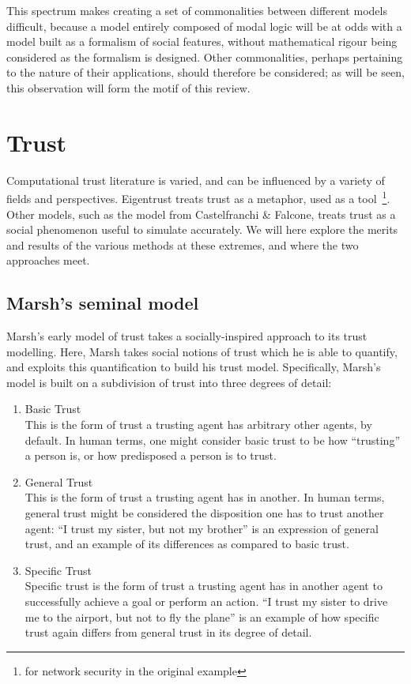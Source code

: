 \documentclass[11pt,english,twocolumn]{article}
\begin{document}
This spectrum makes creating a set of commonalities between different models difficult, because a model entirely composed of modal logic will be at odds with a model built as a formalism of social features, without mathematical rigour being considered as the formalism is designed. Other commonalities, perhaps pertaining to the nature of their applications, should therefore be considered; as will be seen, this observation will form the motif of this review.\par


\section{Trust}
Computational trust literature is varied, and can be influenced by a variety of fields and perspectives. Eigentrust\cite{Kamvar2003} treats trust as a metaphor, used as a tool~\footnote{for network security in the original example}. Other models, such as the model from Castelfranchi \& Falcone, treats trust as a social phenomenon useful to simulate accurately. We will here explore the merits and results of the various methods at these extremes, and where the two approaches meet.\par

\subsection{Marsh's seminal model}
Marsh's early model of trust\cite{Marsh1994} takes a socially-inspired approach to its trust modelling. Here, Marsh takes social notions of trust which he is able to quantify, and exploits this quantification to build his trust model. Specifically, Marsh's model is built on a subdivision of trust into three degrees of detail:

\begin{enumerate}
    \item Basic Trust\\
        This is the form of trust a trusting agent has arbitrary other agents, by default. In human terms, one might consider basic trust to be how ``trusting'' a person is, or how predisposed a person is to trust.
    \item General Trust\\
        This is the form of trust a trusting agent has in another. In human terms, general trust might be considered the disposition one has to trust another agent: ``I trust my sister, but not my brother'' is an expression of general trust, and an example of its differences as compared to basic trust.
    \item Specific Trust\\
        Specific trust is the form of trust a trusting agent has in another agent to successfully achieve a goal or perform an action. ``I trust my sister to drive me to the airport, but not to fly the plane'' is an example of how specific trust again differs from general trust in its degree of detail.
\end{enumerate}
\end{document}
